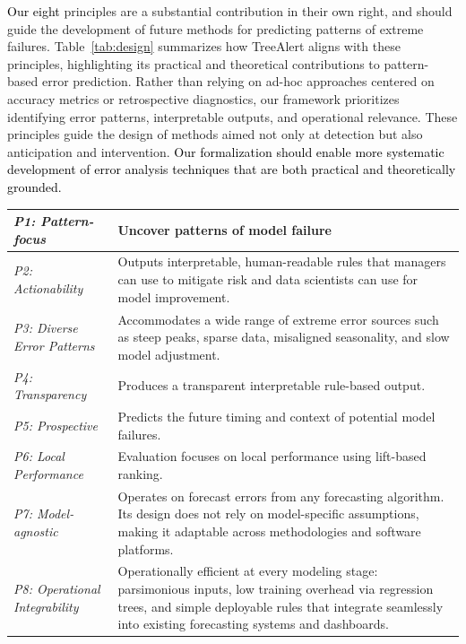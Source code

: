 \documentclass[12pt]{article}
\newcommand{\galit}[1]{\textcolor{black}{#1}}
\let\oldtable\table
\let\endoldtable\endtable
\renewenvironment{table}
  {\oldtable\spacingset{1}}
  {\endoldtable}
\begin{document}
\galit{Our eight} %
principles %
are a substantial contribution in their own right, and should guide the development of future methods for predicting patterns of extreme failures. Table~\ref{tab:design} summarizes how TreeAlert aligns with these principles, highlighting its practical and theoretical contributions to pattern-based error prediction. Rather than relying on ad-hoc approaches centered on accuracy metrics or retrospective diagnostics, our framework prioritizes identifying error patterns, interpretable outputs, and operational relevance. These principles guide the design of methods aimed not only at detection but also anticipation and intervention. \galit{Our  formalization %
should enable more systematic development of error analysis techniques that are both practical and theoretically grounded.}

\begin{table}
\centering
\caption{\textit{How TreeAlert Embodies the Design Principles for Pattern-Based Error Prediction}}
\small
\begin{tabular}{|m{3cm}|m{12.2cm}|}
\hline
\centering\textit{P1: Pattern-focus} &
Uncover patterns of model failure \\
\hline
\centering\textit{P2: Actionability} &
Outputs interpretable, human-readable rules that managers can use to mitigate risk and data scientists can use for model improvement. \\
\hline
\centering\textit{P3: Diverse Error Patterns} &
Accommodates a wide range of extreme error sources such as steep peaks, sparse data, misaligned seasonality, and slow model adjustment. \\
\hline
\centering\textit{P4: Transparency} &
Produces a transparent interpretable rule-based output. \\
\hline
\centering\textit{P5: Prospective} &
Predicts the future timing and context of potential model failures. \\
\hline
\centering\textit{P6: Local Performance} &
Evaluation focuses on local performance using lift-based ranking. \\
\hline
\centering\textit{P7: Model-agnostic} &
Operates on forecast errors from any forecasting algorithm. Its design does not rely on model-specific assumptions, making it adaptable across methodologies and software platforms. \\
\hline
\centering\textit{P8: Operational Integrability} &
Operationally efficient at every modeling stage: parsimonious inputs, low training overhead via regression trees, and simple deployable rules that integrate seamlessly into existing forecasting systems and dashboards. \\
\hline
\end{tabular}
\label{tab:design}
\end{table}
\end{document}
